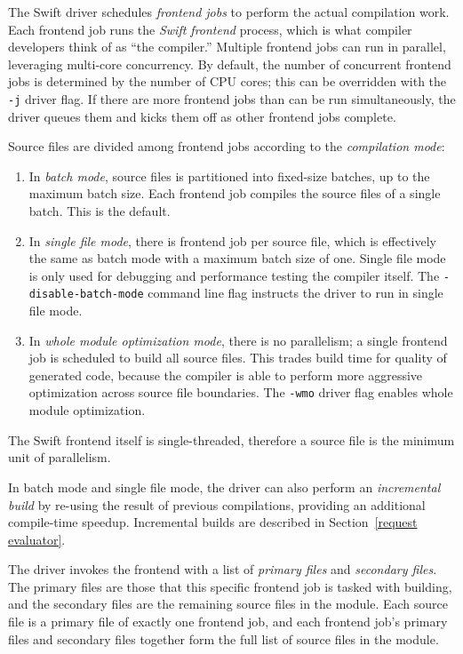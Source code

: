 \documentclass[a4paper,headsepline,bibliography=totoc,toc=flat,fleqn,twoside=semi]{scrbook}
\theoremstyle{definition}
\theoremstyle{definition}
\theoremstyle{definition}
\begin{document}
The Swift driver schedules \emph{frontend jobs} to perform the actual compilation work. Each frontend job runs the \emph{Swift frontend} process, which is what compiler developers think of as ``the compiler.'' Multiple frontend jobs can run in parallel, leveraging multi-core concurrency. By default, the number of concurrent frontend jobs is determined by the number of CPU cores; this can be overridden with the \texttt{-j} driver flag. If there are more frontend jobs than can be run simultaneously, the driver queues them and kicks them off as other frontend jobs complete.

Source files are divided among frontend jobs according to the \emph{compilation mode}:
\begin{enumerate}
\item In \emph{batch mode}, source files is partitioned into fixed-size batches, up to the maximum batch size. Each frontend job compiles the source files of a single batch. This is the default.
\item In \emph{single file mode}, there is frontend job per source file, which is effectively the same as batch mode with a maximum batch size of one. Single file mode is only used for debugging and performance testing the compiler itself. The \texttt{-disable-batch-mode} command line flag instructs the driver to run in single file mode.
\item In \emph{whole module optimization mode}, there is no parallelism; a single frontend job is scheduled to build all source files. This trades build time for quality of generated code, because the compiler is able to perform more aggressive optimization across source file boundaries. The \texttt{-wmo} driver flag enables whole module optimization.
\end{enumerate}
The Swift frontend itself is single-threaded, therefore a source file is the minimum unit of parallelism.

In batch mode and single file mode, the driver can also perform an \emph{incremental build} by re-using the result of previous compilations, providing an additional compile-time speedup. Incremental builds are described in Section~\ref{request evaluator}.

The driver invokes the frontend with a list of \emph{primary files} and \emph{secondary files}. The primary files are those that this specific frontend job is tasked with building, and the secondary files are the remaining source files in the module. Each source file is a primary file of exactly one frontend job, and each frontend job's primary files and secondary files together form the full list of source files in the module.
\end{document}
